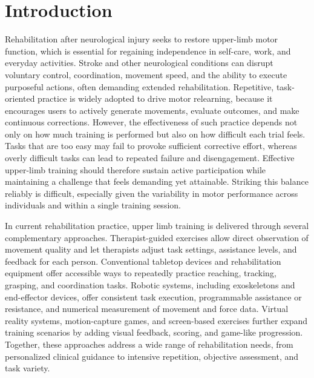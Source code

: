 \documentclass[letterpaper,journal]{IEEEtran}
\begin{document}
\section{Introduction}
Rehabilitation after neurological injury seeks to restore upper-limb motor function, which is essential for regaining independence in self-care, work, and everyday activities. Stroke and other neurological conditions can disrupt voluntary control, coordination, movement speed, and the ability to execute purposeful actions, often demanding extended rehabilitation. Repetitive, task-oriented practice is widely adopted to drive motor relearning, because it encourages users to actively generate movements, evaluate outcomes, and make continuous corrections. However, the effectiveness of such practice depends not only on how much training is performed but also on how difficult each trial feels. Tasks that are too easy may fail to provoke sufficient corrective effort, whereas overly difficult tasks can lead to repeated failure and disengagement. Effective upper-limb training should therefore sustain active participation while maintaining a challenge that feels demanding yet attainable. Striking this balance reliably is difficult, especially given the variability in motor performance across individuals and within a single training session.

In current rehabilitation practice, upper limb training is delivered through several complementary approaches. Therapist-guided exercises allow direct observation of movement quality and let therapists adjust task settings, assistance levels, and feedback for each person. Conventional tabletop devices and rehabilitation equipment offer accessible ways to repeatedly practice reaching, tracking, grasping, and coordination tasks. Robotic systems, including exoskeletons and end-effector devices, offer consistent task execution, programmable assistance or resistance, and numerical measurement of movement and force data. Virtual reality systems, motion-capture games, and screen-based exercises further expand training scenarios by adding visual feedback, scoring, and game-like progression. Together, these approaches address a wide range of rehabilitation needs, from personalized clinical guidance to intensive repetition, objective assessment, and task variety.
\end{document}
